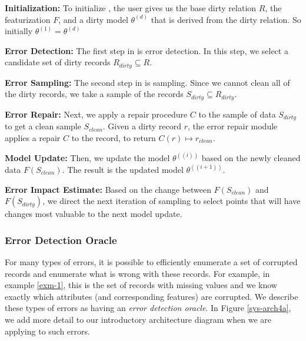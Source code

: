 \vspace{0.5em}

\noindent\textbf{Initialization: } To initialize \sys, the user gives us the base dirty relation $R$, the featurization $F$, and a dirty model $\theta^{(d)}$ that is derived from the dirty relation. So initially $\theta^{(1)} = \theta^{(d)}$

\vspace{0.5em}

\noindent\textbf{Error Detection: } The first step in \sys is error detection. In this step, we select a candidate set of dirty records $R_{dirty} \subseteq R$.  

\vspace{0.5em}

\noindent\textbf{Error Sampling: } The second step in \sys is sampling. Since we cannot clean all of the dirty records, we take a sample of the records $S_{dirty} \subseteq R_{dirty}$.

\vspace{0.5em}

\noindent\textbf{Error Repair: } Next, we apply a repair procedure $C$ to the sample of data $S_{dirty}$ to get a clean sample $S_{clean}$. Given a dirty record $r$, the error repair module applies a repair $C$ to the record, to return $C(r)\mapsto r_{clean}$. 

\vspace{0.5em}

\noindent\textbf{Model Update: } Then, we update the model $\theta^({(i)})$ based on the newly cleaned data $F(S_{clean})$. The result is the updated model $\theta^({(i+1)})$.

\vspace{0.5em}

\noindent\textbf{Error Impact Estimate: } Based on the change between $F(S_{clean})$ and $F(S_{dirty})$, we direct the next iteration of sampling to select points that will have changes most valuable to the next model update.

\subsubsection{Error Detection Oracle}
For many types of errors, it is possible to efficiently enumerate a set of corrupted records and enumerate what is wrong with these records.
For example, in example \ref{exm-1}, this is the set of records with missing values and we know exactly which attributes (and corresponding features) are corrupted.
We describe these types of errors as having an \emph{error detection oracle}.
In Figure \ref{sys-arch4a}, we add more detail to our introductory architecture diagram when we are applying \sys to such errors.

